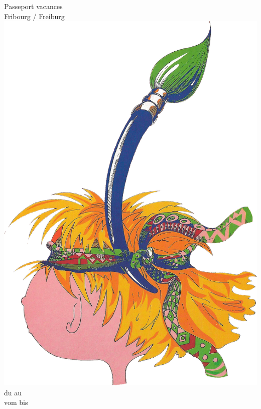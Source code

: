 \begin{titlepage}
\begin{center}
{\indieflower\fontsize{45}{40}\selectfont{} Passeport vacances\\
\vspace*{3mm}
Fribourg / Freiburg }
\vfill
\includegraphics[width=.68\textwidth]{fig/logo.jpg}
\vfill
{\indieflower\fontsize{32}{32}\selectfont{}du  au  }\\
\vspace*{3mm}
{\indieflower\fontsize{32}{32}\selectfont{}vom  bis  }

\end{center}
\end{titlepage}

